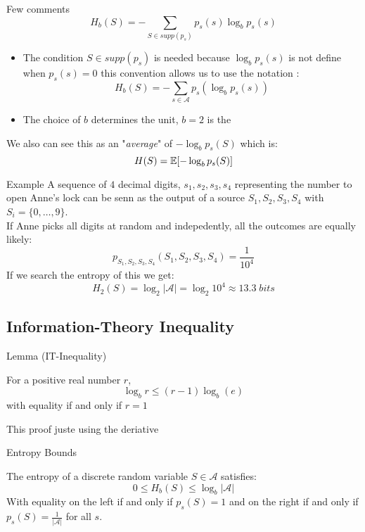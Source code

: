 \begin{parag}{Few comments}
    \[H_b(S) = - \sum_{S \in supp(p_s)}p_s(s)\log_bp_s(s)\]
    \begin{itemize}
        \item The condition $S \in supp(p_s)$ is needed because $\log_bp_s(s)$ is not define when $p_s(s) = 0$ this convention allows us to use the notation : 
        \[H_b(S) = - \sum_{s \in \mathcal{A}}p_s(\log_bp_s(s))\]
        \item The choice of $b$ determines the unit, $b= 2$ is the 
    \end{itemize}
    We also can see this as an "\textit{average}" of $-\log_b p_s(S)$ which is:
    \[H(S) = \mathbb{E} [-\log_bp_s(S)]\]
\end{parag}

\begin{parag}{Example}
    A sequence of $4$ decimal digits, $s_1, s_2, s_3, s_4$ representing the number to open Anne's lock can be senn as the output of a source $S_1, S_2, S_3, S_4$ with $S_i = \{0, \dots, 9\}$.
    \\
    If Anne picks all digits at random and indepedently,  all the outcomes are equally likely:
    \[p_{S_1, S_2, S_3, S_4}(S_1, S_2, S_3, S_4) = \frac{1}{10^4}\]
    If we search the entropy of this we get:
    \[H_2(S) = \log_2|\mathcal{A}| = \log_2 10^4 \approx 13.3 \; bits\]
\end{parag}

\subsection{Information-Theory Inequality}
\begin{parag}{Lemma (IT-Inequality)}
    \begin{lemme}
        For a positive real number $r$, 
        \[\log_b r \leq (r-1)\log_b(e)\]
        with equality if and only if $r = 1$
    \end{lemme}
    This proof juste using the deriative
    
\end{parag}
\begin{parag}{Entropy Bounds}
    \begin{theoreme}
        The entropy of a discrete  random variable $S \in \mathcal{A}$ satisfies:
        \[0 \leq H_b(S) \leq \log_b|\mathcal{A|}\]
        With equality on the left if and only if  $p_s(S) = 1$ and on the right if and only if $p_s(S) = \frac{1}{|\mathcal{A}|}$ for all  $s$.
    \end{theoreme}
\end{parag}
